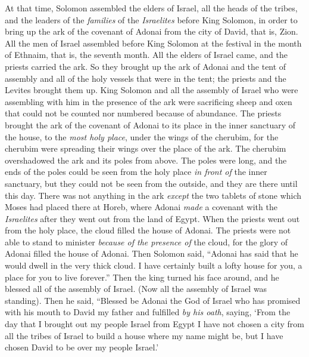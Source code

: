 \begin{biblechapter} %
 At that time, Solomon assembled the elders of Israel, all the heads of the tribes, and the leaders of the \textit{families} of the \textit{Israelites} before King Solomon, in order to bring up the ark of the covenant of Adonai from the city of David, that is, Zion.
\verse All the men of Israel assembled before King Solomon at the festival in the month of Ethnaim, that is, the seventh month.
\verse All the elders of Israel came, and the priests carried the ark.
\verse So they brought up the ark of Adonai and the tent of assembly and all of the holy vessels that were in the tent; the priests and the Levites brought them up.
\verse King Solomon and all the assembly of Israel who were assembling with him in the presence of the ark were sacrificing sheep and oxen that could not be counted nor numbered because of abundance.
\verse The priests brought the ark of the covenant of Adonai to its place in the inner sanctuary of the house, to the \textit{most holy place}, under the wings of the cherubim,
\verse for the cherubim were spreading their wings over the place of the ark. The cherubim overshadowed the ark and its poles from above.
\verse The poles were long, and the ends of the poles could be seen from the holy place \textit{in front of} the inner sanctuary, but they could not be seen from the outside, and they are there until this day.
\verse There was not anything in the ark \textit{except} the two tablets of stone which Moses had placed there at Horeb, where Adonai \textit{made} a covenant with the \textit{Israelites} after they went out from the land of Egypt.
\verse When the priests went out from the holy place, the cloud filled the house of Adonai.
\verse The priests were not able to stand to minister \textit{because of the presence of} the cloud, for the glory of Adonai filled the house of Adonai.
 Then Solomon said, “Adonai has said that he would dwell in the very thick cloud.
\verse I have certainly built a lofty house for you, a place for you to live forever.”
\verse Then the king turned his face around, and he blessed all of the assembly of Israel. (Now all the assembly of Israel was standing).
\verse Then he said, “Blessed be Adonai the God of Israel who has promised with his mouth to David my father and fulfilled \textit{by his oath}, saying,
\verse ‘From the day that I brought out my people Israel from Egypt I have not chosen a city from all the tribes of Israel to build a house where my name might be, but I have chosen David to be over my people Israel.’

\end{biblechapter}
